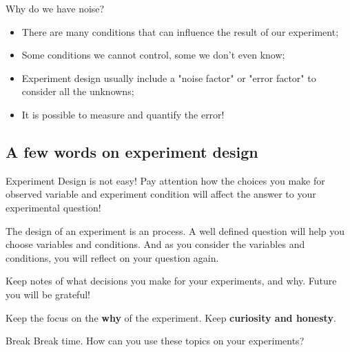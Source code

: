 \begin{frame}[t]{Why do we have noise?}
    \begin{itemize}
        \item There are many conditions that can influence the result of our experiment;
        \item Some conditions we cannot control, some we don't even know;
        \item Experiment design usually include a "noise factor" or "error factor" to consider all the unknowns;
        \item \alert{It is possible to measure and quantify the error!}
    \end{itemize}   
\end{frame}


\subsection{A few words on experiment design}

\begin{frame}[t]{Experiment Design is not easy!}
    Pay attention how the choices you make for observed variable and experiment condition will affect the answer to your experimental question!\bigskip

    The design of an experiment is an  process. A well defined question will help you choose variables and conditions. And as you consider the variables and conditions, you will reflect on your question again.\bigskip

    Keep notes of what decisions you make for your experiments, and why. Future you will be grateful!\bigskip 

    \begin{block}{}
    Keep the focus on the {\bf why} of the experiment. Keep {\bf curiosity and honesty}.
    \end{block}
\end{frame}

\begin{frame}{Break}
    Break time. How can you use these topics on your experiments?
\end{frame}

